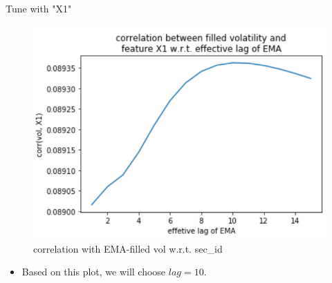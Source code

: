 \documentclass{beamer}
\begin{document}
\begin{frame}{Tune with "X1"}
\begin{figure}[ht]
\centering
\includegraphics[scale=0.7]{corr_vol_x1.PNG}
\caption{correlation with EMA-filled vol w.r.t. sec\_id}
\label{fig:label}
\end{figure}
\begin{itemize}
\item{Based on this plot, we will choose $lag=10$.}
\end{itemize}
\end{frame}
\end{document}
